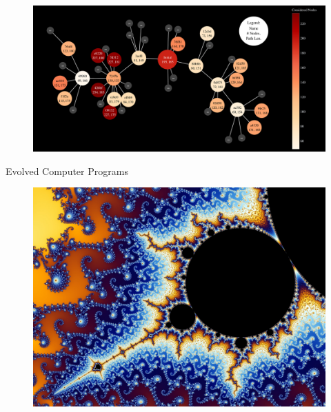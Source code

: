 \documentclass[aspectratio=169]{beamer}
\makeatletter
\renewcommand{\emph}[1]{{\Huge \color{pureminimalistic@text@red} #1}}
\makeatother
\begin{document}
\begin{frame}[plain]
  \begin{figure}
  \centering
  \includegraphics[width=1.0\linewidth,keepaspectratio]{figures/tree.pdf}
  \end{figure}
  \begin{center}
  \emph{Evolved Computer Programs}
  \end{center}
\end{frame}

\begin{frame}[plain]{}
  \begin{figure}
  \vspace*{-4em}
  \hspace*{-4em}
  \includegraphics[width=1.2\linewidth,keepaspectratio]{figures/mandelbrot_2.jpg}
  \end{figure}
\end{frame}
\end{document}
